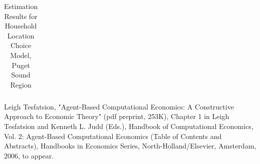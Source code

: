 \documentclass[12pt,a4paper]{article}
\begin{document}
\clearpage
\begin{table}[h]
\caption{Estimation Results for Household Location Choice Model,
Puget Sound Region} \label{tab:hlc} \centering
\begin{tabular}{lrr|rr|rr}
\\

\end{tabular}

\end{table}
\clearpage



Leigh Tesfatsion, "Agent-Based Computational Economics: A
Constructive Approach to Economic Theory"  (pdf preprint, 253K),
Chapter 1 in Leigh Tesfatsion and Kenneth L. Judd (Eds.), Handbook
of Computational Economics, Vol. 2: Agent-Based Computational
Economics   (Table of Contents and Abstracts), Handbooks in
Economics Series, North-Holland/Elsevier, Amsterdam, 2006, to
appear.






\end{document}
